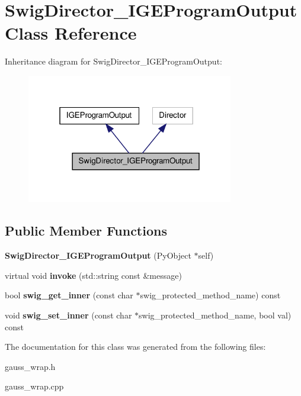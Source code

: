 \hypertarget{class_swig_director___i_g_e_program_output}{\section{Swig\-Director\-\_\-\-I\-G\-E\-Program\-Output Class Reference}
\label{class_swig_director___i_g_e_program_output}
}


Inheritance diagram for Swig\-Director\-\_\-\-I\-G\-E\-Program\-Output\-:\nopagebreak
\begin{figure}[H]
\begin{center}
\leavevmode
\includegraphics[width=256pt]{class_swig_director___i_g_e_program_output__inherit__graph}
\end{center}
\end{figure}
\subsection*{Public Member Functions}
\begin{DoxyCompactItemize}
\item 
\hypertarget{class_swig_director___i_g_e_program_output_a894b8ccab3beded9495a2f1397a63bc1}{{\bfseries Swig\-Director\-\_\-\-I\-G\-E\-Program\-Output} (Py\-Object $\ast$self)}\label{class_swig_director___i_g_e_program_output_a894b8ccab3beded9495a2f1397a63bc1}

\item 
\hypertarget{class_swig_director___i_g_e_program_output_aa7dad558395e15a3f248f8ae44e2ee2a}{virtual void {\bfseries invoke} (std\-::string const \&message)}\label{class_swig_director___i_g_e_program_output_aa7dad558395e15a3f248f8ae44e2ee2a}

\item 
\hypertarget{class_swig_director___i_g_e_program_output_a7702b52b2775517842f88a6cf58447fd}{bool {\bfseries swig\-\_\-get\-\_\-inner} (const char $\ast$swig\-\_\-protected\-\_\-method\-\_\-name) const }\label{class_swig_director___i_g_e_program_output_a7702b52b2775517842f88a6cf58447fd}

\item 
\hypertarget{class_swig_director___i_g_e_program_output_a7c228742775f638a93bfb2db540710ec}{void {\bfseries swig\-\_\-set\-\_\-inner} (const char $\ast$swig\-\_\-protected\-\_\-method\-\_\-name, bool val) const }\label{class_swig_director___i_g_e_program_output_a7c228742775f638a93bfb2db540710ec}

\end{DoxyCompactItemize}


The documentation for this class was generated from the following files\-:\begin{DoxyCompactItemize}
\item 
gauss\-\_\-wrap.\-h\item 
gauss\-\_\-wrap.\-cpp\end{DoxyCompactItemize}
